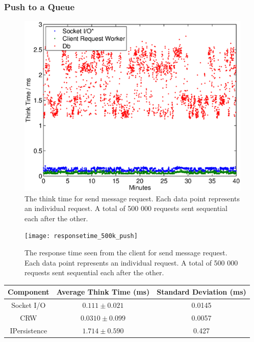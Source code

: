 \documentclass{article}
\begin{document}
        \subsubsection{Push to a Queue}
        
            \begin{figure}[H]
                \hspace{-1.5cm}
                \includegraphics[scale=0.50]{thinktime_500k_push}
                \caption{The think time for send message request. Each data point represents an individual request. A total of 500 000 requests sent sequential each after the other.}
                \label{fig:thinktime_500k_push}
            \end{figure}
            
            \begin{figure}[H]
                \hspace{-1.5cm}
                \texttt{[image: responsetime\_500k\_push]}
                \caption{The response time seen from the client for send message request. Each data point represents an individual request. A total of 500 000 requests sent sequential each after the other.}
                \label{fig:responsetime_500k_push}
            \end{figure}
                
            \begin{tabular}{|c|c|c|}
                \hline 
                \textbf{Component} & \textbf{Average Think Time} (ms) & \textbf{Standard Deviation (ms)} \\ 
                \hline 
                Socket I/O & $0.111 \pm 0.021$ &0.0145\\ 
                \hline 
                CRW & $0.0310 \pm0.099$ &0.0057\\ 
                \hline 
                IPersistence & $1.714 \pm 0.590$ &0.427\\ 
                \hline 
            \end{tabular} 
            
\end{document}
